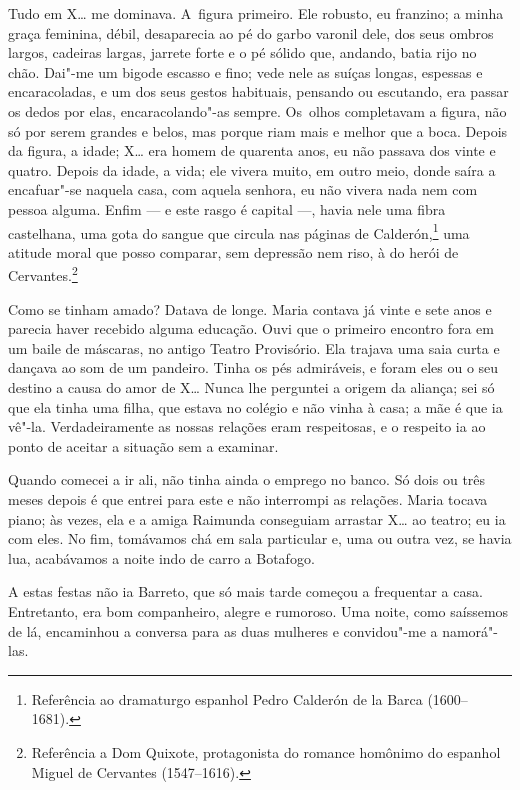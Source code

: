 \begin{linenumbers}
Tudo em X\ldots{} me dominava. A~figura primeiro. Ele robusto, eu franzino; a
minha graça feminina, débil, desaparecia ao pé do garbo varonil dele,
dos seus ombros largos, cadeiras largas, jarrete forte e o pé sólido
que, andando, batia rijo no chão. Dai"-me um bigode escasso e fino; vede
nele as suíças longas, espessas e encaracoladas, e um dos seus gestos
habituais, pensando ou escutando, era passar os dedos por elas,
encaracolando"-as sempre. Os~olhos completavam a figura, não só por serem
grandes e belos, mas porque riam mais e melhor que a boca. Depois da
figura, a idade; X\ldots{} era homem de quarenta anos, eu não passava dos
vinte e quatro. Depois da idade, a vida; ele vivera muito, em outro
meio, donde saíra a encafuar"-se naquela casa, com aquela senhora, eu não
vivera nada nem com pessoa alguma. Enfim --- e este rasgo é capital ---,
havia nele uma fibra castelhana, uma gota do sangue que circula nas
páginas de Calderón,\footnote{Referência ao dramaturgo espanhol Pedro
  Calderón de la Barca (1600--1681).} uma atitude moral que posso
comparar, sem depressão nem riso, à do herói de Cervantes.\footnote{Referência
  a Dom Quixote, protagonista do romance homônimo do espanhol Miguel de
  Cervantes (1547--1616).}

Como se tinham amado? Datava de longe. Maria contava já vinte e sete
anos e parecia haver recebido alguma educação. Ouvi que o primeiro
encontro fora em um baile de máscaras, no antigo Teatro Provisório. Ela
trajava uma saia curta e dançava ao som de um pandeiro. Tinha os pés
admiráveis, e foram eles ou o seu destino a causa do amor de X\ldots{} Nunca
lhe perguntei a origem da aliança; sei só que ela tinha uma filha, que
estava no colégio e não vinha à casa; a mãe é que ia vê"-la.
Verdadeiramente as nossas relações eram respeitosas, e o respeito ia ao
ponto de aceitar a situação sem a examinar.

Quando comecei a ir ali, não tinha ainda o emprego no banco. Só dois ou
três meses depois é que entrei para este e não interrompi as relações.
Maria tocava piano; às vezes, ela e a amiga Raimunda conseguiam arrastar
X\ldots{} ao teatro; eu ia com eles. No fim, tomávamos chá em sala particular
e, uma ou outra vez, se havia lua, acabávamos a noite indo de carro a
Botafogo.

A estas festas não ia Barreto, que só mais tarde começou a frequentar a
casa. Entretanto, era bom companheiro, alegre e rumoroso. Uma noite,
como saíssemos de lá, encaminhou a conversa para as duas mulheres e
convidou"-me a namorá"-las.


\end{linenumbers}
